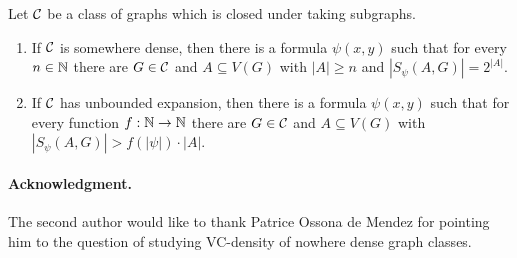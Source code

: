 \begin{theorem}\label{thm:vc-density-lower-bound}
Let $\mathcal{C}$ be a class of graphs which 
is closed under taking subgraphs. 
\begin{enumerate}
\item If $\mathcal{C}$ is somewhere dense, then there is a formula 
$\psi(x,y)$ such that for every $n\in \mathbb{N}$ there are $G\in\mathcal{C}$ and $A\subseteq V(G)$ 
with $|A|\geq n$ and $|S_\psi(A,G)|=2^{|A|}$. 
\item If $\mathcal{C}$ has unbounded expansion, then there is a formula 
$\psi(x,y)$ such that for every function $f:\mathbb{N}\rightarrow \mathbb{N}$ 
there are $G\in\mathcal{C}$ and $A\subseteq V(G)$ 
with $|S_\psi(A,G)|>f(|\psi|)\cdot |A|$. 
\end{enumerate}
\end{theorem}

\paragraph{Acknowledgment. } The second author would like to 
thank Patrice Ossona de Mendez for pointing him to the 
question of studying VC-density of nowhere dense graph 
classes. 

\pagebreak


%




